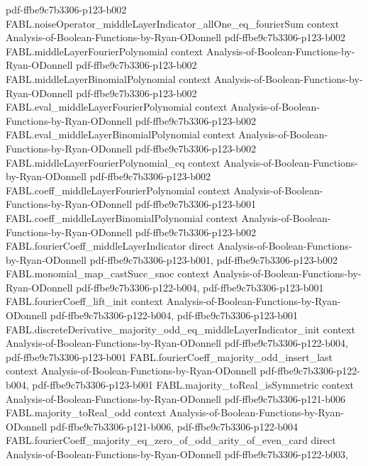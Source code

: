 \begin{theorem}
  {pdf-ffbe9c7b3306-p123-b002}
\proofstep
  {FABL.noiseOperator_middleLayerIndicator_allOne_eq_fourierSum}
  {context}
  {Analysis-of-Boolean-Functions-by-Ryan-ODonnell}
  {pdf-ffbe9c7b3306-p123-b002}
\proofstep
  {FABL.middleLayerFourierPolynomial}
  {context}
  {Analysis-of-Boolean-Functions-by-Ryan-ODonnell}
  {pdf-ffbe9c7b3306-p123-b002}
\proofstep
  {FABL.middleLayerBinomialPolynomial}
  {context}
  {Analysis-of-Boolean-Functions-by-Ryan-ODonnell}
  {pdf-ffbe9c7b3306-p123-b002}
\proofstep
  {FABL.eval_middleLayerFourierPolynomial}
  {context}
  {Analysis-of-Boolean-Functions-by-Ryan-ODonnell}
  {pdf-ffbe9c7b3306-p123-b002}
\proofstep
  {FABL.eval_middleLayerBinomialPolynomial}
  {context}
  {Analysis-of-Boolean-Functions-by-Ryan-ODonnell}
  {pdf-ffbe9c7b3306-p123-b002}
\proofstep
  {FABL.middleLayerFourierPolynomial_eq}
  {context}
  {Analysis-of-Boolean-Functions-by-Ryan-ODonnell}
  {pdf-ffbe9c7b3306-p123-b002}
\proofstep
  {FABL.coeff_middleLayerFourierPolynomial}
  {context}
  {Analysis-of-Boolean-Functions-by-Ryan-ODonnell}
  {pdf-ffbe9c7b3306-p123-b001}
\proofstep
  {FABL.coeff_middleLayerBinomialPolynomial}
  {context}
  {Analysis-of-Boolean-Functions-by-Ryan-ODonnell}
  {pdf-ffbe9c7b3306-p123-b002}
\proofstep
  {FABL.fourierCoeff_middleLayerIndicator}
  {direct}
  {Analysis-of-Boolean-Functions-by-Ryan-ODonnell}
  {pdf-ffbe9c7b3306-p123-b001,
    pdf-ffbe9c7b3306-p123-b002}
\proofstep
  {FABL.monomial_map_castSucc_snoc}
  {context}
  {Analysis-of-Boolean-Functions-by-Ryan-ODonnell}
  {pdf-ffbe9c7b3306-p122-b004,
    pdf-ffbe9c7b3306-p123-b001}
\proofstep
  {FABL.fourierCoeff_lift_init}
  {context}
  {Analysis-of-Boolean-Functions-by-Ryan-ODonnell}
  {pdf-ffbe9c7b3306-p122-b004,
    pdf-ffbe9c7b3306-p123-b001}
\proofstep
  {FABL.discreteDerivative_majority_odd_eq_middleLayerIndicator_init}
  {context}
  {Analysis-of-Boolean-Functions-by-Ryan-ODonnell}
  {pdf-ffbe9c7b3306-p122-b004,
    pdf-ffbe9c7b3306-p123-b001}
\proofstep
  {FABL.fourierCoeff_majority_odd_insert_last}
  {context}
  {Analysis-of-Boolean-Functions-by-Ryan-ODonnell}
  {pdf-ffbe9c7b3306-p122-b004,
    pdf-ffbe9c7b3306-p123-b001}
\proofstep
  {FABL.majority_toReal_isSymmetric}
  {context}
  {Analysis-of-Boolean-Functions-by-Ryan-ODonnell}
  {pdf-ffbe9c7b3306-p121-b006}
\proofstep
  {FABL.majority_toReal_odd}
  {context}
  {Analysis-of-Boolean-Functions-by-Ryan-ODonnell}
  {pdf-ffbe9c7b3306-p121-b006,
    pdf-ffbe9c7b3306-p122-b004}
\proofstep
  {FABL.fourierCoeff_majority_eq_zero_of_odd_arity_of_even_card}
  {direct}
  {Analysis-of-Boolean-Functions-by-Ryan-ODonnell}
  {pdf-ffbe9c7b3306-p122-b003,
}
\end{theorem}
